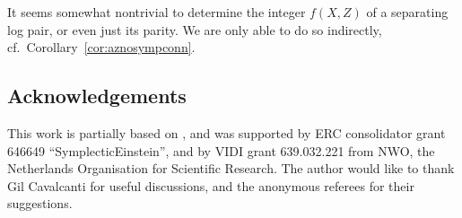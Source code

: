 \documentclass[pdftex]{sigma}
\numberwithin{equation}{section}
\begin{document}
\begin{Remark} It seems somewhat nontrivial to determine the integer $f(X,Z)$ of a separating log pair, or even just its parity. We are only able to do so indirectly, cf.\ Corollary~\ref{cor:aznosympconn}.
\end{Remark}

\subsection*{Acknowledgements}

This work is partially based on \cite[Chapter 11]{Klaasse17}, and was supported by ERC consolidator grant 646649 ``SymplecticEinstein'', and by VIDI grant 639.032.221 from NWO, the Netherlands Organisation for Scientific Research. The author would like to thank Gil Cavalcanti for useful discussions, and the anonymous referees for their suggestions.
\end{document}
